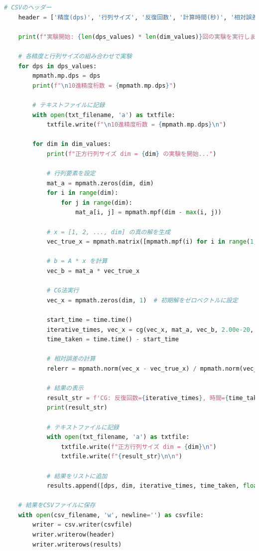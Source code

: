 \documentclass{article}
\begin{document}
\begin{lstlisting}[language=Python, caption=cg\_experiment.py]
    # CSVのヘッダー
    header = ['精度(dps)', '行列サイズ', '反復回数', '計算時間(秒)', '相対誤差']
    
    print(f"実験開始: {len(dps_values) * len(dim_values)}回の実験を実行します")
    
    # 各精度と行列サイズの組み合わせで実験
    for dps in dps_values:
        mpmath.mp.dps = dps
        print(f"\n10進精度桁数 = {mpmath.mp.dps}")
        
        # テキストファイルに記録
        with open(txt_filename, 'a') as txtfile:
            txtfile.write(f"\n10進精度桁数 = {mpmath.mp.dps}\n")
        
        for dim in dim_values:
            print(f"正方行列サイズ dim = {dim} の実験を開始...")
            
            # 行列要素を設定
            mat_a = mpmath.zeros(dim, dim)
            for i in range(dim):
                for j in range(dim):
                    mat_a[i, j] = mpmath.mpf(dim - max(i, j))
            
            # x = [1, 2, ..., dim] の真の解を生成
            vec_true_x = mpmath.matrix([mpmath.mpf(i) for i in range(1, dim + 1)])
            
            # b = A * x を計算
            vec_b = mat_a * vec_true_x

            # CG法実行
            vec_x = mpmath.zeros(dim, 1)  # 初期解をゼロベクトルに設定
            
            start_time = time.time()
            iterative_times, vec_x = cg(vec_x, mat_a, vec_b, 2.00e-20, 0.0, dim * 10)
            time_taken = time.time() - start_time
            
            # 相対誤差の計算
            relerr = mpmath.norm(vec_x - vec_true_x) / mpmath.norm(vec_true_x)
            
            # 結果の表示
            result_str = f'CG: 反復回数={iterative_times}, 時間={time_taken:.4f}秒, 相対誤差={mpmath.nstr(relerr)}'
            print(result_str)
            
            # テキストファイルに記録
            with open(txt_filename, 'a') as txtfile:
                txtfile.write(f"正方行列サイズ dim = {dim}\n")
                txtfile.write(f"{result_str}\n\n")
            
            # 結果をリストに追加
            results.append([dps, dim, iterative_times, time_taken, float(relerr)])
    
    # 結果をCSVファイルに保存
    with open(csv_filename, 'w', newline='') as csvfile:
        writer = csv.writer(csvfile)
        writer.writerow(header)
        writer.writerows(results)
    

\end{lstlisting}
\end{document}
